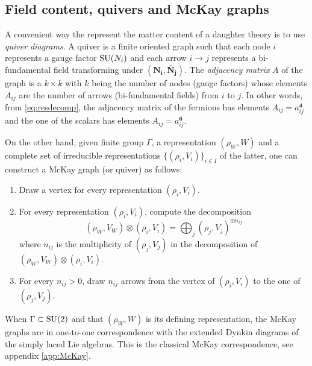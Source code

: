        \subsection{Field content, quivers and McKay graphs}

            A convenient way the represent the matter content of a daughter theory is to use \emph{quiver diagrams}. A quiver is a finite oriented graph such that each node $i$ represents a gauge factor $\text{SU}(N_i)$ and each arrow $i\to j$ represents a bi-fundamental field transforming under $(\boldsymbol{\textbf{N}_i},\boldsymbol{\bar{\textbf{N}}_j})$. The \emph{adjacency matrix} $A$ of the graph is a $k\times k$ with $k$ being the number of nodes (gauge factors) whose elements $A_{ij}$ are the number of arrows (bi-fundamental fields) from $i$ to $j$. In other words, from \eqref{eq:resdecomp}, the adjacency matrix of the fermions has elements $A_{ij}=a^{\boldsymbol{4}}_{ij}$ and the one of the scalars has elements $A_{ij}=a^{\boldsymbol{6}}_{ij}$.

            On the other hand, given finite group $\Gamma$, a representation $(\rho_W,W)$ and a complete set of irreducible representations $\{(\rho_i,V_i)\}_{i\in I}$ of the latter, one can construct a McKay graph (or quiver) as follows:
            \begin{enumerate}
                \item Draw a vertex for every representation $(\rho_i,V_i)$.
                \item For every representation $(\rho_i,V_i)$, compute the decomposition
                \begin{equation*}
                    (\rho_W,V_W)\otimes(\rho_i,V_i)=\bigoplus_j (\rho_j,V_j)^{\oplus n_{ij}}
                \end{equation*}
                where $n_{ij}$ is the multiplicity of $(\rho_j,V_j)$ in the decomposition of $(\rho_W,V_W)\otimes(\rho_i,V_i)$.
                \item For every $n_{ij}>0$, draw $n_{ij}$ arrows from the vertex of $(\rho_i,V_i)$ to the one of $(\rho_j,V_j)$.
            \end{enumerate}
            When $\Gamma\subset\text{SU}(2)$ and that $(\rho_W,W)$ is its defining representation, the McKay graphs are in one-to-one correspondence with the extended Dynkin diagrams of the simply laced Lie algebras. This is the classical McKay correspondence, see appendix \ref{app:McKay}.
            
